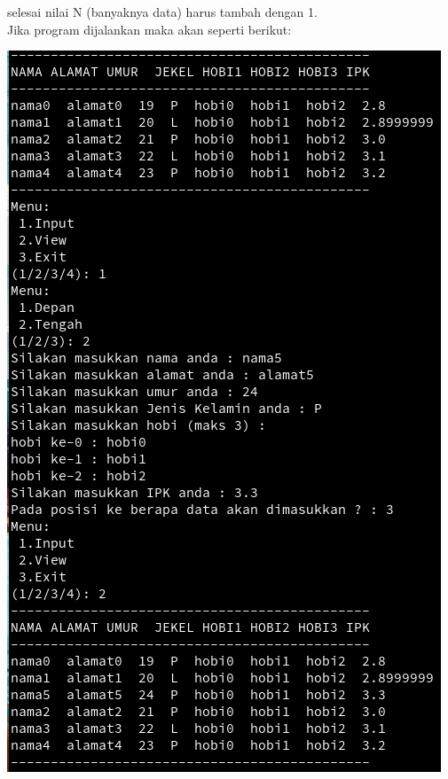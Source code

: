 \documentclass[a4paper,12pt]{article}
\begin{document}
selesai nilai N (banyaknya data) harus tambah dengan 1.\\
Jika program dijalankan maka akan seperti berikut:
\begin{center}
    \includegraphics[scale=.7]{prak2.png} 
\end{center}
\end{document}
